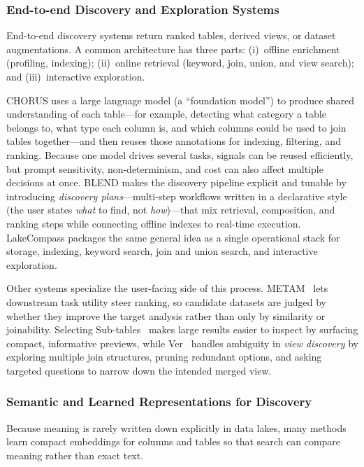 \documentclass[sigconf]{acmart}
\begin{document}
\subsubsection{End-to-end Discovery and Exploration Systems}
End-to-end discovery systems return ranked tables, derived views, or dataset augmentations. A common architecture has three parts: (i)~offline enrichment (profiling, indexing); (ii)~online retrieval (keyword, join, union, and view search); and (iii)~interactive exploration.

CHORUS uses a large language model (a ``foundation model'') to produce shared understanding of each table---for example, detecting what category a table belongs to, what type each column is, and which columns could be used to join tables together---and then reuses those annotations for indexing, filtering, and ranking. Because one model drives several tasks, signals can be reused efficiently, but prompt sensitivity, non-determinism, and cost can also affect multiple decisions at once. BLEND makes the discovery pipeline explicit and tunable by introducing \emph{discovery plans}---multi-step workflows written in a declarative style (the user states \emph{what} to find, not \emph{how})---that mix retrieval, composition, and ranking steps while connecting offline indexes to real-time execution. LakeCompass packages the same general idea as a single operational stack for storage, indexing, keyword search, join and union search, and interactive exploration.

Other systems specialize the user-facing side of this process. METAM~\cite{10184845} lets downstream task utility steer ranking, so candidate datasets are judged by whether they improve the target analysis rather than only by similarity or joinability. Selecting Sub-tables~\cite{10184535} makes large results easier to inspect by surfacing compact, informative previews, while Ver~\cite{10184768} handles ambiguity in \emph{view discovery} by exploring multiple join structures, pruning redundant options, and asking targeted questions to narrow down the intended merged view.

\subsubsection{Semantic and Learned Representations for Discovery}
Because meaning is rarely written down explicitly in data lakes, many methods learn compact embeddings for columns and tables so that search can compare meaning rather than exact text.
\end{document}
